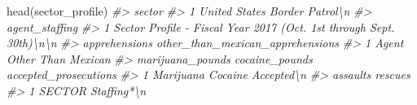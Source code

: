 \documentclass[
  12pt,
  openany]{book}
\newenvironment{Shaded}{\begin{snugshade}}{\end{snugshade}}
\newcommand{\CommentTok}[1]{\textcolor[rgb]{0.37,0.37,0.37}{\textit{#1}}}
\newcommand{\FunctionTok}[1]{\textcolor[rgb]{0,0,0}{#1}}
\newcommand{\NormalTok}[1]{#1}
\begin{document}
\begin{Shaded}
\begin{Highlighting}[]
\FunctionTok{head}\NormalTok{(sector\_profile)}
\CommentTok{\#\textgreater{}                          sector}
\CommentTok{\#\textgreater{} 1 United States Border Patrol\textbackslash{}n}
\CommentTok{\#\textgreater{}                                                        agent\_staffing}
\CommentTok{\#\textgreater{} 1 Sector Profile {-} Fiscal Year 2017 (Oct. 1st through Sept. 30th)\textbackslash{}n\textbackslash{}n}
\CommentTok{\#\textgreater{}   apprehensions other\_than\_mexican\_apprehensions}
\CommentTok{\#\textgreater{} 1         Agent               Other Than Mexican}
\CommentTok{\#\textgreater{}   marijuana\_pounds cocaine\_pounds accepted\_prosecutions}
\CommentTok{\#\textgreater{} 1        Marijuana        Cocaine            Accepted\textbackslash{}n}
\CommentTok{\#\textgreater{}   assaults     rescues}
\CommentTok{\#\textgreater{} 1   SECTOR Staffing*\textbackslash{}n}

\end{Highlighting}
\end{Shaded}
\end{document}
